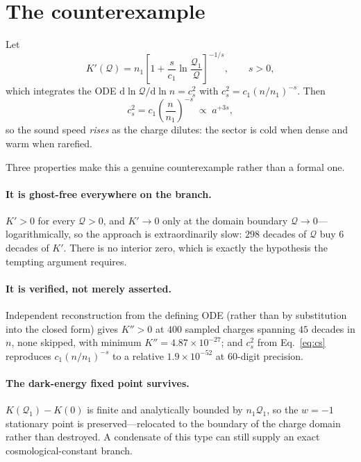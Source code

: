 \documentclass[aps,prd,twocolumn,superscriptaddress,nofootinbib,floatfix]{revtex4-2}
\begin{document}
\section{The counterexample}

Let
\begin{equation}
K'(\mathcal{Q}) = n_1\left[1+\frac{s}{c_1}\ln\frac{\mathcal{Q}_1}{\mathcal{Q}}\right]^{-1/s},
\qquad s>0 ,
\label{eq:counter}
\end{equation}
which integrates the ODE $\mathrm{d}\ln\mathcal{Q}/\mathrm{d}\ln n = c_s^2$ with
$c_s^2 = c_1(n/n_1)^{-s}$. Then
\begin{equation}
c_s^2 = c_1\left(\frac{n}{n_1}\right)^{-s} \;\propto\; a^{+3s},
\end{equation}
so the sound speed \emph{rises} as the charge dilutes: the sector is cold when dense and warm
when rarefied.

Three properties make this a genuine counterexample rather than a formal one.

\paragraph{It is ghost-free everywhere on the branch.}
$K'>0$ for every $\mathcal{Q}>0$, and $K'\to0$ only at the domain boundary
$\mathcal{Q}\to0$---logarithmically, so the approach is extraordinarily slow: $298$ decades
of $\mathcal{Q}$ buy $6$ decades of $K'$. There is no interior zero, which is exactly the
hypothesis the tempting argument requires.

\paragraph{It is verified, not merely asserted.}
Independent reconstruction from the defining ODE (rather than by substitution into the closed
form) gives $K''>0$ at $400$ sampled charges spanning $45$ decades in $n$, none skipped, with
minimum $K'' = 4.87\times10^{-27}$; and $c_s^2$ from Eq.~\eqref{eq:cs} reproduces
$c_1(n/n_1)^{-s}$ to a relative $1.9\times10^{-52}$ at $60$-digit precision.

\paragraph{The dark-energy fixed point survives.}
$K(\mathcal{Q}_1)-K(0)$ is finite and analytically bounded by $n_1\mathcal{Q}_1$, so the
$w=-1$ stationary point is preserved---relocated to the boundary of the charge domain rather
than destroyed. A condensate of this type can still supply an exact cosmological-constant
branch.
\end{document}
